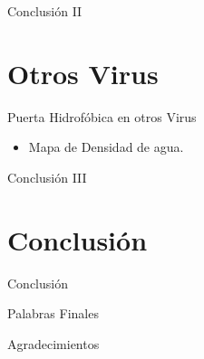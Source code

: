 \documentclass[8pt]{beamer}
\begin{document}
\begin{frame}[t]{Conclusión II}

\end{frame}


\section{Otros Virus}

\begin{frame}[t]{Puerta Hidrofóbica en otros Virus}
\begin{itemize}
  \item Mapa de Densidad de agua.
\end{itemize}
\end{frame}


\begin{frame}[t]{Conclusión III}

\end{frame}

\section{Conclusión}

\begin{frame}[t]{Conclusión}

\end{frame}


\begin{frame}[t]{Palabras Finales}

\end{frame}


\begin{frame}[t]{Agradecimientos}

\end{frame}
\end{document}
